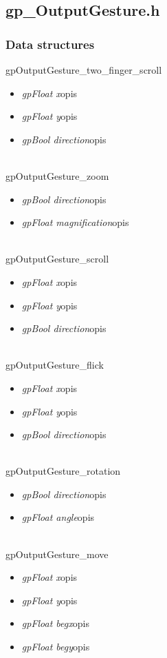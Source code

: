 \subsection{gp_OutputGesture.h}
\subsubsection{Data structures}
\textsf{gpOutputGesture_two_finger_scroll}
	\begin{itemize}
		\item \textit{gpFloat x}\quad opis
		\item \textit{gpFloat y}\quad opis
		\item \textit{gpBool direction}\quad opis
	\end{itemize}
\ \\
\textsf{gpOutputGesture_zoom}
	\begin{itemize}
		\item \textit{gpBool direction}\quad opis
		\item \textit{gpFloat magnification}\quad opis
	\end{itemize}
\ \\
\textsf{gpOutputGesture_scroll}
	\begin{itemize}
		\item \textit{gpFloat x}\quad opis
		\item \textit{gpFloat y}\quad opis
		\item \textit{gpBool direction}\quad opis
	\end{itemize}
\ \\
\textsf{gpOutputGesture_flick}
	\begin{itemize}
		\item \textit{gpFloat x}\quad opis
		\item \textit{gpFloat y}\quad opis
		\item \textit{gpBool direction}\quad opis
	\end{itemize}
\ \\
\textsf{gpOutputGesture_rotation}
	\begin{itemize}
		\item \textit{gpBool direction}\quad opis
		\item \textit{gpFloat angle}\quad opis
	\end{itemize}
\ \\
\textsf{gpOutputGesture_move}
	\begin{itemize}
		\item \textit{gpFloat x}\quad opis
		\item \textit{gpFloat y}\quad opis
		\item \textit{gpFloat begx}\quad opis
		\item \textit{gpFloat begy}\quad opis
	\end{itemize}
